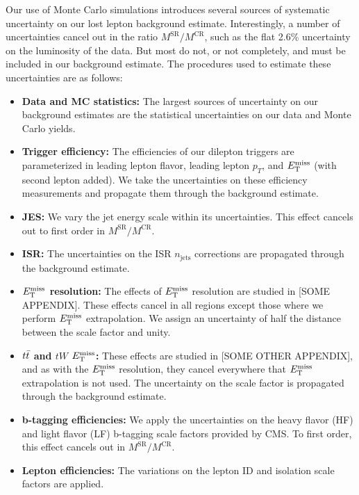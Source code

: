 Our use of Monte Carlo simulations introduces several sources of
systematic uncertainty on our lost lepton background
estimate. Interestingly, a number of uncertainties cancel out in the
ratio $M^\text{SR} / M^\text{CR}$, such as the flat 2.6\% uncertainty
on the luminosity of the data. But most do not, or not completely, and
must be included in our background estimate. The procedures used to
estimate these uncertainties are as follows:

\begin{itemize}
\item \textbf{Data and MC statistics:} The largest sources of uncertainty
  on our background estimates are the statistical uncertainties on our
  data and Monte Carlo yields.
\item \textbf{Trigger efficiency:} The efficiencies of our dilepton
  triggers are parameterized in leading lepton flavor, leading lepton
  $p_T$, and $E_\text{T}^\text{miss}$ (with second lepton added). We take the
  uncertainties on these efficiency measurements and propagate them
  through the background estimate.
\item \textbf{JES:} We vary the jet energy scale within its
  uncertainties. This effect cancels out to first order in
  $M^\text{SR} / M^\text{CR}$.
\item \textbf{ISR:} The uncertainties on the ISR $n_\text{jets}$ corrections are
  propagated through the background estimate.
\item \textbf{$E_\text{T}^\text{miss}$ resolution:} The effects of $E_\text{T}^\text{miss}$ resolution are %
  studied in [SOME APPENDIX]. These effects cancel in all regions
  except those where we perform $E_\text{T}^\text{miss}$ extrapolation. We assign an
  uncertainty of half the distance between the scale factor and
  unity.
\item \textbf{$t\bar{t}$ and $tW$ $E_\text{T}^\text{miss}$:} These effects are studied in %
  [SOME OTHER APPENDIX], and as with the $E_\text{T}^\text{miss}$ resolution, they
  cancel everywhere that $E_\text{T}^\text{miss}$ extrapolation is not used. The
  uncertainty on the scale factor is propagated through the background
  estimate.
\item \textbf{b-tagging efficiencies:} We apply the uncertainties on the heavy
  flavor (HF) and light flavor (LF) b-tagging scale factors provided
  by CMS. To first order, this effect cancels out in $M^\text{SR} /
  M^\text{CR}$.
\item \textbf{Lepton efficiencies:} The variations on the lepton ID
  and isolation scale factors are applied.

\end{itemize}
